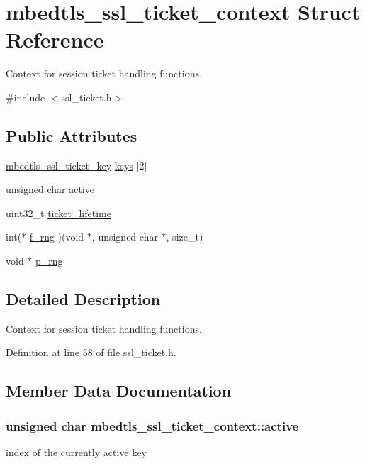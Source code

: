 \hypertarget{structmbedtls__ssl__ticket__context}{\section{mbedtls\-\_\-ssl\-\_\-ticket\-\_\-context Struct Reference}
\label{structmbedtls__ssl__ticket__context}
}


Context for session ticket handling functions.  




{\ttfamily \#include $<$ssl\-\_\-ticket.\-h$>$}

\subsection*{Public Attributes}
\begin{DoxyCompactItemize}
\item 
\hyperlink{structmbedtls__ssl__ticket__key}{mbedtls\-\_\-ssl\-\_\-ticket\-\_\-key} \hyperlink{structmbedtls__ssl__ticket__context_a92f8b74506a299795117cf0b60504442}{keys} \mbox{[}2\mbox{]}
\item 
unsigned char \hyperlink{structmbedtls__ssl__ticket__context_aed5bcb363146b9498dd1345e5c141044}{active}
\item 
uint32\-\_\-t \hyperlink{structmbedtls__ssl__ticket__context_ae2548112f1ab8d5ceb7752a205ce358c}{ticket\-\_\-lifetime}
\item 
int($\ast$ \hyperlink{structmbedtls__ssl__ticket__context_a08d1247391c2ff04ba9c07c424329b6f}{f\-\_\-rng} )(void $\ast$, unsigned char $\ast$, size\-\_\-t)
\item 
void $\ast$ \hyperlink{structmbedtls__ssl__ticket__context_a304d8f181d24a4ddbe5b7f0052229b9c}{p\-\_\-rng}
\end{DoxyCompactItemize}


\subsection{Detailed Description}
Context for session ticket handling functions. 

Definition at line 58 of file ssl\-\_\-ticket.\-h.



\subsection{Member Data Documentation}
\hypertarget{structmbedtls__ssl__ticket__context_aed5bcb363146b9498dd1345e5c141044}{
\subsubsection[{active}]{\setlength{\rightskip}{0pt plus 5cm}unsigned char mbedtls\-\_\-ssl\-\_\-ticket\-\_\-context\-::active}}\label{structmbedtls__ssl__ticket__context_aed5bcb363146b9498dd1345e5c141044}
index of the currently active key 

